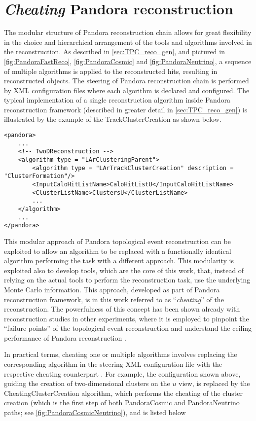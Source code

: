 \section{\emph{Cheating} Pandora reconstruction} \label{sec:cheatingPandora}

The modular structure of Pandora reconstruction chain allows for great flexibility in the choice and hierarchical arrangement of the tools and algorithms involved in the reconstruction. As described in \autoref{sec:TPC_reco_gen}, and pictured in \autoref{fig:PandoraFastReco}, \ref{fig:PandoraCosmic} and \ref{fig:PandoraNeutrino}, a sequence of multiple algorithms is applied to the reconstructed hits, resulting in reconstructed objects. The steering of Pandora reconstruction chain is performed by XML configuration files where each algorithm is declared and configured. The typical implementation of a single reconstruction algorithm inside Pandora reconstruction framework (described in greater detail in \autoref{sec:TPC_reco_gen}) is illustrated by the example of the TrackClusterCreation as shown below. 

\begin{lstlisting}[style=xmlstyle]
<pandora>
    ...
    <!-- TwoDReconstruction -->
    <algorithm type = "LArClusteringParent">
        <algorithm type = "LArTrackClusterCreation" description = "ClusterFormation"/>
        <InputCaloHitListName>CaloHitListU</InputCaloHitListName>
        <ClusterListName>ClustersU</ClusterListName>
        ...
    </algorithm>
    ...
</pandora>
\end{lstlisting}

This modular approach of Pandora topological event reconstruction can be exploited to allow an algorithm to be replaced with a functionally identical algorithm performing the task with a different approach. This modularity is exploited also to develop tools, which are the core of this work, that, instead of relying on the actual tools to perform the reconstruction task, use the underlying Monte Carlo information. This approach, developed as part of Pandora reconstruction framework, is in this work referred to as ``\emph{cheating}'' of the reconstruction. The powerfulness of this concept has been shown already with reconstruction studies in other experiments, where it is employed to pinpoint the ``failure points'' of the topological event reconstruction and understand the ceiling performance of Pandora reconstruction \cite{Mawby:2023nws, Mawby:2025_FCCee, Nguyen:2023_cheatingPandora}. 

In practical terms, cheating one or multiple algorithms involves replacing the corresponding algorithm in the steering XML configuration file with the respective cheating counterpart \cite{Nguyen:2023_cheatingPandora}. For example, the configuration shown above, guiding the creation of two-dimensional clusters on the $u$ view, is replaced by the CheatingClusterCreation algorithm, which performs the cheating of the cluster creation (which is the first step of both PandoraCosmic and PandoraNeutrino paths; see \autoref{fig:PandoraCosmicNeutrino}), and is listed below

